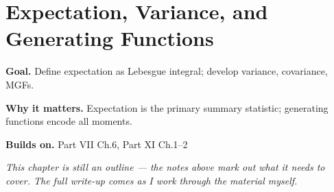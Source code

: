 \chapter{Expectation, Variance, and Generating Functions}
\label{ch:11-probability-theory-03}

\begin{chapterintro}
\textbf{Goal.} Define expectation as Lebesgue integral; develop variance, covariance, MGFs.

\textbf{Why it matters.} Expectation is the primary summary statistic; generating functions encode all moments.

\textbf{Builds on.} Part VII Ch.6, Part XI Ch.1–2
\end{chapterintro}

\textit{This chapter is still an outline --- the notes above mark out what it needs to cover. The full write-up comes as I work through the material myself.}
